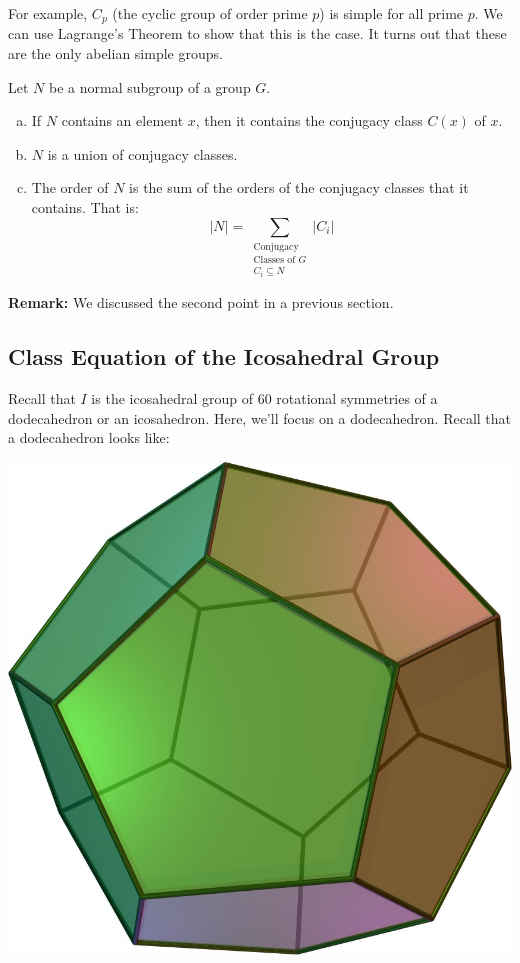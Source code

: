 \documentclass[letterpaper]{article}
\begin{document}
For example, $C_p$ (the cyclic group of order prime $p$) is simple for all prime $p$. We can use Lagrange's Theorem to show that this is the case. It turns out that these are the only abelian simple groups.

\begin{lemma}{}{}
    Let $N$ be a normal subgroup of a group $G$. 
    \begin{enumerate}[(a)]
        \item If $N$ contains an element $x$, then it contains the conjugacy class $C(x)$ of $x$. 
        \item $N$ is a union of conjugacy classes. 
        \item The order of $N$ is the sum of the orders of the conjugacy classes that it contains. That is: 
        \[|N| = \sum_{\substack{\text{Conjugacy} \\ \text{Classes of $G$} \\ C_i \subseteq N}} |C_i|\]
    \end{enumerate}
\end{lemma}
\textbf{Remark:} We discussed the second point in a previous section. 



\subsection{Class Equation of the Icosahedral Group}
Recall that $I$ is the icosahedral group of 60 rotational symmetries of a dodecahedron or an icosahedron. Here, we'll focus on a dodecahedron. Recall that a dodecahedron looks like: 
\begin{center}
    \includegraphics[scale=0.1]{assets/dodeca.jpg}
\end{center}
\end{document}
